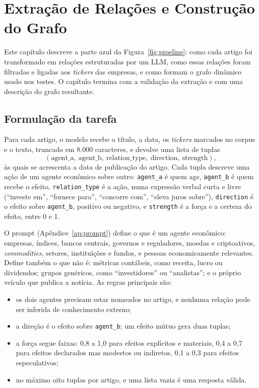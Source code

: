 \chapter{Extração de Relações e Construção do Grafo}
\label{cap:extracao}

Este capítulo descreve a parte azul da Figura~\ref{fig:pipeline}: como cada artigo foi transformado em
relações estruturadas por um LLM, como essas relações foram filtradas e ligadas aos \emph{tickers} das
empresas, e como formam o grafo dinâmico usado nos testes. O capítulo termina com a validação da
extração e com uma descrição do grafo resultante.

\section{Formulação da tarefa}
\label{sec:tarefa}

Para cada artigo, o modelo recebe o título, a data, os \emph{tickers} marcados no corpus e o texto,
truncado em 8.000 caracteres, e devolve uma lista de tuplas
\begin{equation}
  (\text{agent\_a},\ \text{agent\_b},\ \text{relation\_type},\ \text{direction},\ \text{strength}),
  \label{eq:tupla}
\end{equation}
às quais se acrescenta a data de publicação do artigo. Cada tupla descreve uma ação de um agente
econômico sobre outro: \texttt{agent\_a} é quem age, \texttt{agent\_b} é quem recebe o efeito,
\texttt{relation\_type} é a ação, numa expressão verbal curta e livre (``investe em'', ``fornece para'',
``concorre com'', ``eleva juros sobre''), \texttt{direction} é o efeito sobre \texttt{agent\_b}, positivo
ou negativo, e \texttt{strength} é a força e a certeza do efeito, entre 0 e 1.

O prompt (Apêndice~\ref{ap:prompt}) define o que é um agente econômico: empresas, índices, bancos
centrais, governos e reguladores, moedas e criptoativos, \emph{commodities}, setores, instituições e
fundos, e pessoas economicamente relevantes. Define também o que não é: métricas contábeis, como
receita, lucro ou dividendos; grupos genéricos, como ``investidores'' ou ``analistas''; e o próprio
veículo que publica a notícia. As regras principais são:
\begin{itemize}
  \item os dois agentes precisam estar nomeados no artigo, e nenhuma relação pode ser inferida de
        conhecimento externo;
  \item a direção é o efeito sobre \texttt{agent\_b}; um efeito mútuo gera duas tuplas;
  \item a força segue faixas: 0,8 a 1,0 para efeitos explícitos e materiais, 0,4 a 0,7 para efeitos
        declarados mas modestos ou indiretos, 0,1 a 0,3 para efeitos especulativos;
  \item no máximo oito tuplas por artigo, e uma lista vazia é uma resposta válida.
\end{itemize}

